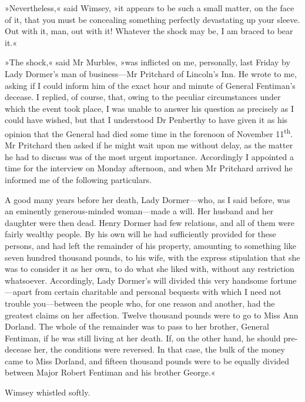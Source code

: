 »Nevertheless,« said Wimsey, »it appears to be such a small matter, on the face of it, that you must be concealing something perfectly devastating up your sleeve. Out with it, man, out with it! Whatever the shock may be, I am braced to bear it.«

»The shock,« said Mr Murbles, »was inflicted on me, personally, last Friday by Lady Dormer's man of business\allowbreak---\allowbreak Mr Pritchard of Lincoln's Inn. He wrote to me, asking if I could inform him of the exact hour and minute of General Fentiman's decease. I replied, of course, that, owing to the peculiar circumstances under which the event took place, I was unable to answer his question as precisely as I could have wished, but that I understood Dr Penberthy to have given it as his opinion that the General had died some time in the forenoon of November  11\textsuperscript{th}. Mr Pritchard then asked if he might wait upon me without delay, as the matter he had to discuss was of the most urgent importance. Accordingly I appointed a time for the interview on Monday afternoon, and when Mr Pritchard arrived he informed me of the following particulars.

A good many years before her death, Lady Dormer\allowbreak---\allowbreak who, as I said before, was an eminently generous-minded woman\allowbreak---\allowbreak made a will. Her husband and her daughter were then dead. Henry Dormer had few relations, and all of them were fairly wealthy people. By his own will he had sufficiently provided for these persons, and had left the remainder of his property, amounting to something like seven hundred thousand pounds, to his wife, with the express stipulation that she was to consider it as her own, to do what she liked with, without any restriction whatsoever. Accordingly, Lady Dormer's will divided this very handsome fortune\allowbreak---\allowbreak apart from certain charitable and personal bequests with which I need not trouble you\allowbreak---\allowbreak between the people who, for one reason and another, had the greatest claims on her affection. Twelve thousand pounds were to go to Miss Ann Dorland. The whole of the remainder was to pass to her brother, General Fentiman, if he was still living at her death. If, on the other hand, he should pre-decease her, the conditions were reversed. In that case, the bulk of the money came to Miss Dorland, and fifteen thousand pounds were to be equally divided between Major Robert Fentiman and his brother George.«

Wimsey whistled softly.

